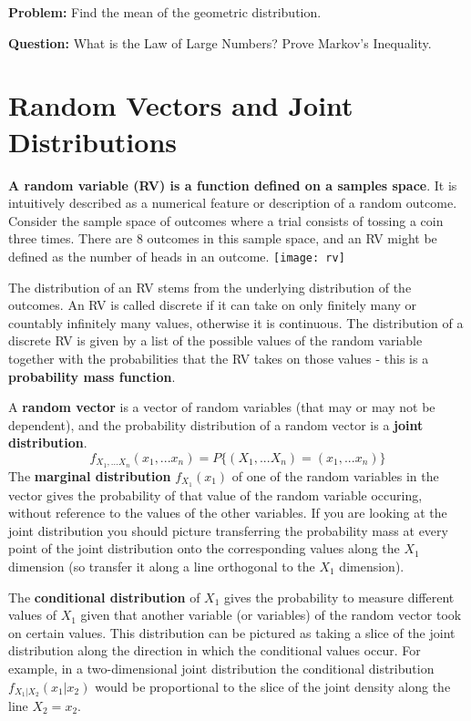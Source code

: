 \noindent
\textbf{Problem:} Find the mean of the geometric distribution.\n

\noindent
\textbf{Question:} What is the Law of Large Numbers? Prove Markov's Inequality.\n


\vspace{.3 in}

\tableofcontents

\section{Random Vectors and Joint Distributions}
\textbf{A random variable (RV) is a function defined on a samples space}. It is intuitively described as a numerical feature or description of a random outcome. Consider the sample space of outcomes where a trial consists of tossing a coin three times. There are 8 outcomes in this sample space, and an RV might be defined as the number of heads in an outcome. 
\nn
\texttt{[image: rv]}
\nn

The distribution of an RV stems from the underlying distribution of the outcomes. An RV is called discrete if it can take on only finitely many or countably infinitely many values, otherwise it is continuous. The distribution of a discrete RV is given by a list of the possible values of the random variable together with the probabilities that the RV takes on those values - this is a \textbf{probability mass function}.
\nn

A \textbf{random vector} is a vector of random variables (that may or may not be dependent), and the probability distribution of a random vector is a \textbf{joint distribution}. 
\begin{equation}
f_{X_1,...X_n}(x_1,...x_n) = P\{(X_1,...X_n)=(x_1,...x_n)\}
\end{equation}
The \textbf{marginal distribution} $f_{X_1}(x_1)$ of one of the random variables in the vector gives the probability of that value of the random variable occuring, without reference to the values of the other variables. If you are looking at the joint distribution you should picture transferring the probability mass at every point of the joint distribution onto the corresponding values along the $X_1$ dimension (so transfer it along a line orthogonal to the $X_1$ dimension). 
\nn

The \textbf{conditional distribution} of $X_1$ gives the probability to measure different values of $X_1$ given that another variable (or variables) of the random vector took on certain values. This distribution can be pictured as taking a slice of the joint distribution along the direction in which the conditional values occur. For example, in a two-dimensional joint distribution the conditional distribution $f_{X_1|X_2}(x_1|x_2)$ would be proportional to the slice of the joint density along the line $X_2 = x_2$. 
\nn

